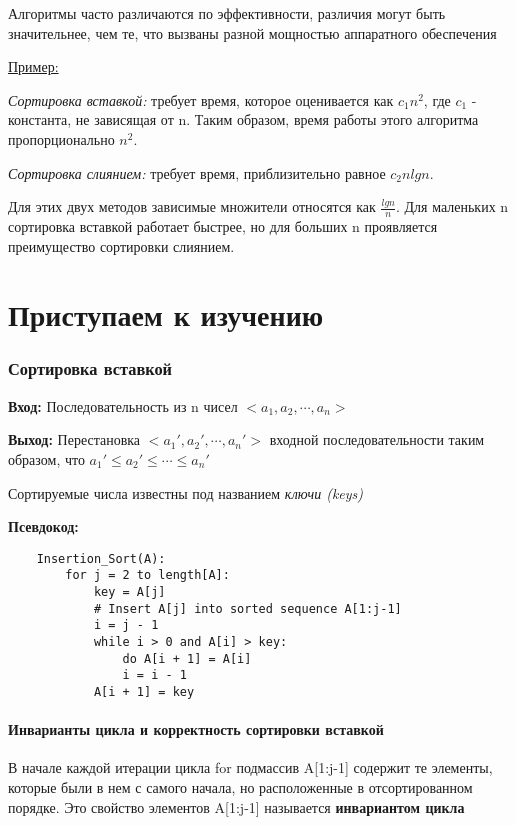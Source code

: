\documentclass[a4paper, 12pt]{article}
\begin{document}
Алгоритмы часто различаются по эффективности, различия могут быть значительнее, чем те, что вызваны разной мощностью аппаратного обеспечения

\underline{Пример:}

\textit{Сортировка вставкой:} требует время, которое оценивается как $c_1n^2$, где $c_1$ - константа, не зависящая от n.
Таким образом, время работы этого алгоритма пропорционально $n^2$.

\textit{Сортировка слиянием:} требует время, приблизительно равное $c_2nlgn$.

Для этих двух методов зависимые множители относятся как $\frac{lgn}{n}$. 
Для маленьких n сортировка вставкой работает быстрее, но для больших n проявляется преимущество сортировки слиянием.

\part{Приступаем к изучению}

\section{Сортировка вставкой}

\textbf{Вход:} Последовательность из n чисел $<a_1, a_2, \cdots, a_n>$

\textbf{Выход:} Перестановка $<a_1', a_2', \cdots, a_n'>$ входной последовательности таким образом, что $a_1' \leq a_2' \leq \cdots \leq a_n'$

Сортируемые числа известны под названием \textit{ключи (keys)}

\textbf{Псевдокод:}

\begin{lstlisting}
    Insertion_Sort(A):
        for j = 2 to length[A]:
            key = A[j]
            # Insert A[j] into sorted sequence A[1:j-1]
            i = j - 1
            while i > 0 and A[i] > key:
                do A[i + 1] = A[i]
                i = i - 1
            A[i + 1] = key
\end{lstlisting}

\subsection{Инварианты цикла и корректность сортировки вставкой}

В начале каждой итерации цикла for подмассив A[1:j-1] содержит те элементы, которые были в нем с самого начала, 
но расположенные в отсортированном порядке. Это свойство элементов A[1:j-1] называется \textbf{инвариантом цикла}
\end{document}

